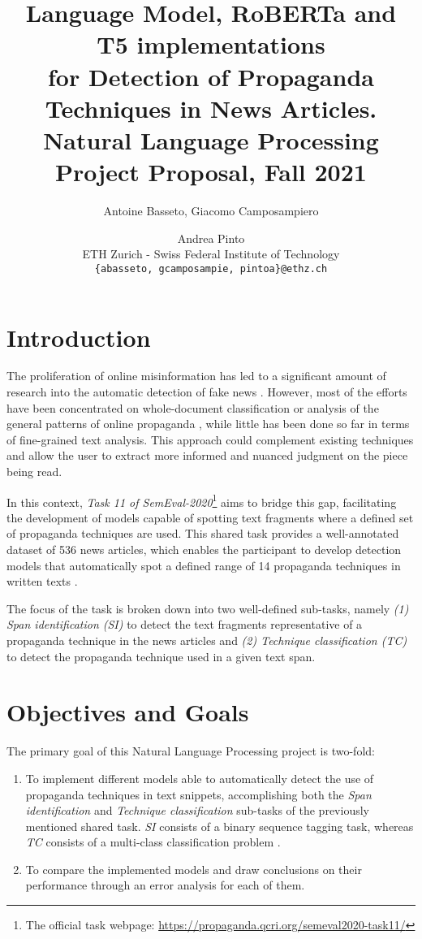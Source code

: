 \documentclass[11pt]{article}
\title{
Language Model, RoBERTa and T5 implementations \\ 
for Detection of Propaganda Techniques in News Articles.\\
\vspace{0.2cm}
\small Natural Language Processing Project Proposal, Fall 2021
}
\author{
Antoine Basseto,
Giacomo Camposampiero 
\and Andrea Pinto \\         
ETH Zurich - Swiss Federal Institute of Technology \\ 
\texttt{\{abasseto, gcamposampie, pintoa\}@ethz.ch}
}
\begin{document}
\maketitle

\section{Introduction}

The proliferation of online misinformation has led to a significant amount of research into the automatic detection of fake news \cite{fakenews}. However, most of the efforts have been concentrated on whole-document classification \cite{rashkin-etal-2017-truth} or analysis of the general patterns of online propaganda \cite{garimella2015, chatfield2015}, while little has been done so far in terms of fine-grained text analysis. This approach could complement existing techniques and allow the user to extract more informed and nuanced judgment on the piece being read.

In this context, \textit{Task 11 of SemEval-2020}\footnote{The official task webpage: \url{https://propaganda.qcri.org/semeval2020-task11/}} \cite{semeval} aims to bridge this gap, facilitating the development of models capable of spotting text fragments where a defined set of propaganda techniques are used. 
This shared task provides a well-annotated dataset of 536 news articles, which enables the participant to develop detection models that automatically spot a defined range of 14 propaganda techniques in written texts \cite{semeval}.

The focus of the task is broken down into two well-defined sub-tasks, namely \textit{(1) Span identification (SI)} to detect the text fragments representative of a propaganda technique in the news articles and \textit{(2) Technique classification (TC)} to detect the propaganda technique used in a given text span.


\section{Objectives and Goals}
The primary goal of this Natural Language Processing project is two-fold:
\begin{enumerate}
    \item To implement different models able to automatically detect the use of propaganda techniques in text snippets, accomplishing both the \textit{Span identification} and \textit{Technique classification} sub-tasks of the previously mentioned shared task. \textit{SI} consists of a binary sequence tagging task, whereas \textit{TC} consists of a multi-class classification problem \cite{semeval}.
    \item To compare the implemented models and draw conclusions on their performance through an error analysis for each of them.
\end{enumerate}
\end{document}
